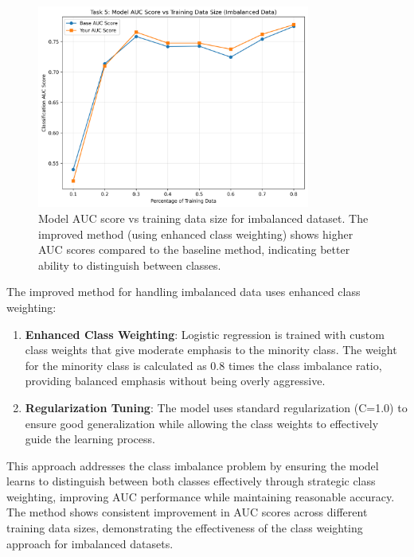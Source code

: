 \documentclass[letterpaper,11pt,twoside]{article}
\begin{document}
\begin{figure}[h]
    \centering
    \includegraphics[width=0.8\textwidth]{../Figures/Figure5.png}
    \caption{Model AUC score vs training data size for imbalanced dataset. The improved method (using enhanced class weighting) shows higher AUC scores compared to the baseline method, indicating better ability to distinguish between classes.}
    \label{fig:task5_auc}
\end{figure}

The improved method for handling imbalanced data uses enhanced class weighting:

\begin{enumerate}
    \item \textbf{Enhanced Class Weighting}: Logistic regression is trained with custom class weights that give moderate emphasis to the minority class. The weight for the minority class is calculated as 0.8 times the class imbalance ratio, providing balanced emphasis without being overly aggressive.
    \item \textbf{Regularization Tuning}: The model uses standard regularization (C=1.0) to ensure good generalization while allowing the class weights to effectively guide the learning process.
\end{enumerate}

This approach addresses the class imbalance problem by ensuring the model learns to distinguish between both classes effectively through strategic class weighting, improving AUC performance while maintaining reasonable accuracy. The method shows consistent improvement in AUC scores across different training data sizes, demonstrating the effectiveness of the class weighting approach for imbalanced datasets.
\end{document}
